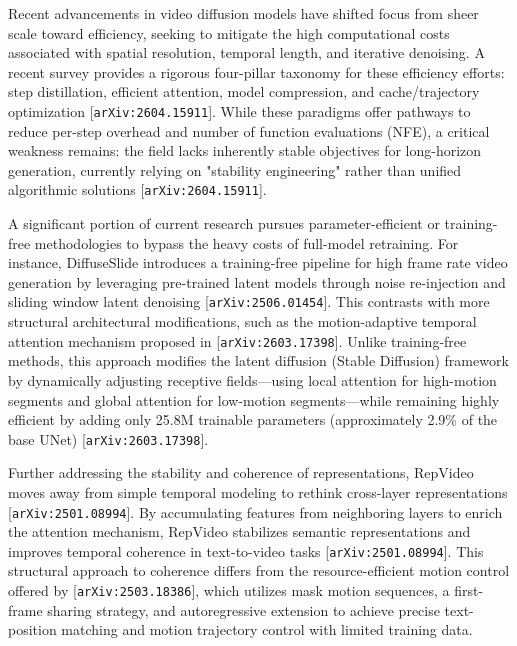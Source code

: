 \documentclass[11pt]{article}
\begin{document}
Recent advancements in video diffusion models have shifted focus from sheer scale toward efficiency, seeking to mitigate the high computational costs associated with spatial resolution, temporal length, and iterative denoising. A recent survey provides a rigorous four-pillar taxonomy for these efficiency efforts: step distillation, efficient attention, model compression, and cache/trajectory optimization [\texttt{arXiv:2604.15911}]. While these paradigms offer pathways to reduce per-step overhead and number of function evaluations (NFE), a critical weakness remains: the field lacks inherently stable objectives for long-horizon generation, currently relying on "stability engineering" rather than unified algorithmic solutions [\texttt{arXiv:2604.15911}].

A significant portion of current research pursues parameter-efficient or training-free methodologies to bypass the heavy costs of full-model retraining. For instance, DiffuseSlide introduces a training-free pipeline for high frame rate video generation by leveraging pre-trained latent models through noise re-injection and sliding window latent denoising [\texttt{arXiv:2506.01454}]. This contrasts with more structural architectural modifications, such as the motion-adaptive temporal attention mechanism proposed in [\texttt{arXiv:2603.17398}]. Unlike training-free methods, this approach modifies the latent diffusion (Stable Diffusion) framework by dynamically adjusting receptive fields—using local attention for high-motion segments and global attention for low-motion segments—while remaining highly efficient by adding only 25.8M trainable parameters (approximately 2.9\% of the base UNet) [\texttt{arXiv:2603.17398}].

Further addressing the stability and coherence of representations, RepVideo moves away from simple temporal modeling to rethink cross-layer representations [\texttt{arXiv:2501.08994}]. By accumulating features from neighboring layers to enrich the attention mechanism, RepVideo stabilizes semantic representations and improves temporal coherence in text-to-video tasks [\texttt{arXiv:2501.08994}]. This structural approach to coherence differs from the resource-efficient motion control offered by [\texttt{arXiv:2503.18386}], which utilizes mask motion sequences, a first-frame sharing strategy, and autoregressive extension to achieve precise text-position matching and motion trajectory control with limited training data.
\end{document}
